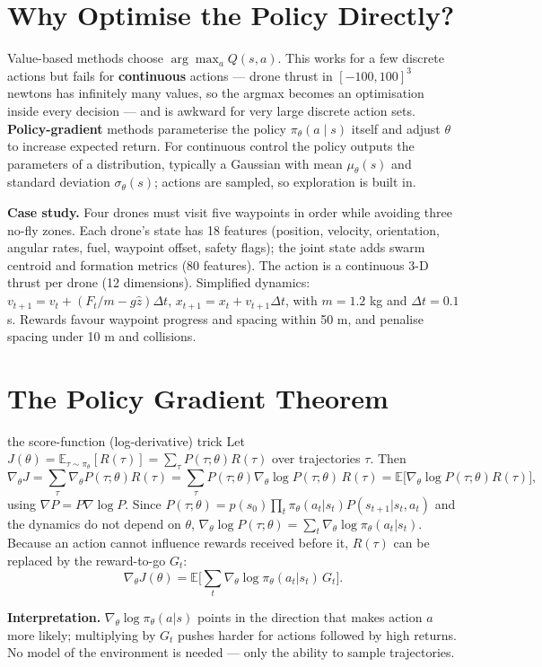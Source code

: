 \documentclass[11pt]{article}
\begin{document}
\tableofcontents
\newpage

\section{Why Optimise the Policy Directly?}
Value-based methods choose $\arg\max_aQ(s,a)$. This works for a few discrete actions but fails for \textbf{continuous} actions --- drone thrust in $[-100,100]^3$ newtons has infinitely many values, so the argmax becomes an optimisation inside every decision --- and is awkward for very large discrete action sets. \textbf{Policy-gradient} methods parameterise the policy $\pi_\theta(a\mid s)$ itself and adjust $\theta$ to increase expected return. For continuous control the policy outputs the parameters of a distribution, typically a Gaussian with mean $\mu_\theta(s)$ and standard deviation $\sigma_\theta(s)$; actions are sampled, so exploration is built in.

\textbf{Case study.} Four drones must visit five waypoints in order while avoiding three no-fly zones. Each drone's state has 18 features (position, velocity, orientation, angular rates, fuel, waypoint offset, safety flags); the joint state adds swarm centroid and formation metrics (80 features). The action is a continuous 3-D thrust per drone (12 dimensions). Simplified dynamics: $v_{t+1}=v_t+(F_t/m-g\hat z)\Delta t$, $x_{t+1}=x_t+v_{t+1}\Delta t$, with $m=1.2$ kg and $\Delta t=0.1$ s. Rewards favour waypoint progress and spacing within 50 m, and penalise spacing under 10 m and collisions.

\section{The Policy Gradient Theorem}
\begin{derivation}{the score-function (log-derivative) trick}
Let $J(\theta)=\mathbb E_{\tau\sim\pi_\theta}[R(\tau)]=\sum_\tau P(\tau;\theta)R(\tau)$ over trajectories $\tau$. Then
\[\nabla_\theta J=\sum_\tau\nabla_\theta P(\tau;\theta)R(\tau)=\sum_\tau P(\tau;\theta)\nabla_\theta\log P(\tau;\theta)\,R(\tau)=\mathbb E\big[\nabla_\theta\log P(\tau;\theta)R(\tau)\big],\]
using $\nabla P=P\nabla\log P$. Since $P(\tau;\theta)=p(s_0)\prod_t\pi_\theta(a_t|s_t)P(s_{t+1}|s_t,a_t)$ and the dynamics do not depend on $\theta$, $\nabla_\theta\log P(\tau;\theta)=\sum_t\nabla_\theta\log\pi_\theta(a_t|s_t)$. Because an action cannot influence rewards received before it, $R(\tau)$ can be replaced by the reward-to-go $G_t$:
\[\nabla_\theta J(\theta)=\mathbb E\Big[\sum_t\nabla_\theta\log\pi_\theta(a_t|s_t)\,G_t\Big].\]
\end{derivation}
\textbf{Interpretation.} $\nabla_\theta\log\pi_\theta(a|s)$ points in the direction that makes action $a$ more likely; multiplying by $G_t$ pushes harder for actions followed by high returns. No model of the environment is needed --- only the ability to sample trajectories.
\end{document}
